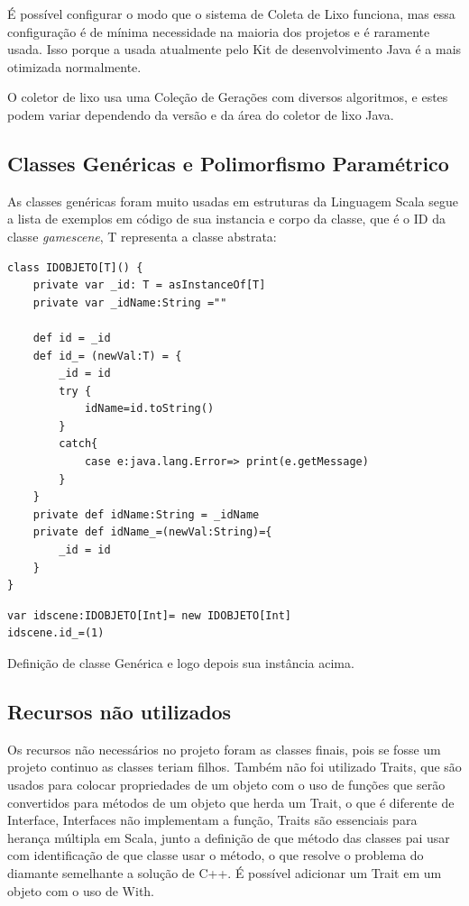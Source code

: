 \documentclass[rel-mlp]{iiufrgs}
\begin{document}
 É possível configurar o modo que o sistema de Coleta de Lixo funciona, mas essa configuração é de mínima necessidade na maioria dos projetos e é raramente usada. Isso porque a usada atualmente pelo Kit de desenvolvimento Java é a mais otimizada normalmente.

 O coletor de lixo usa uma Coleção de Gerações com diversos algoritmos, e estes podem variar dependendo da versão e da área do coletor de lixo Java.
    
\newpage   
\subsection{Classes Genéricas e Polimorfismo Paramétrico}

 As classes genéricas foram muito usadas em estruturas da Linguagem Scala segue a lista de exemplos em código de sua instancia e corpo da classe, que é o ID da classe \textit{gamescene}, T representa a classe abstrata:

\begin{lstlisting}
class IDOBJETO[T]() {
    private var _id: T = asInstanceOf[T]
    private var _idName:String =""
    
    def id = _id
    def id_= (newVal:T) = {
        _id = id
        try {
            idName=id.toString()
        }
        catch{
            case e:java.lang.Error=> print(e.getMessage)
        }
    }
    private def idName:String = _idName
    private def idName_=(newVal:String)={
        _id = id
    }
}
\end{lstlisting}

\begin{lstlisting}
var idscene:IDOBJETO[Int]= new IDOBJETO[Int]
idscene.id_=(1)
\end{lstlisting}
Definição de classe Genérica e logo depois sua instância acima.


\newpage
\subsection{Recursos não utilizados}

Os recursos não necessários no projeto foram as classes finais, pois se fosse um projeto continuo as classes teriam filhos. Também não foi utilizado Traits, que são usados para colocar propriedades de um objeto com o uso de funções que serão convertidos para métodos de um objeto que herda um Trait, o que é diferente de Interface, Interfaces não implementam a função, Traits são essenciais para herança múltipla em Scala, junto a definição de que método das classes pai usar com identificação de que classe usar o método, o que resolve o problema do diamante semelhante a solução de C++. É possível adicionar um Trait em um objeto com o uso de With.
\end{document}
